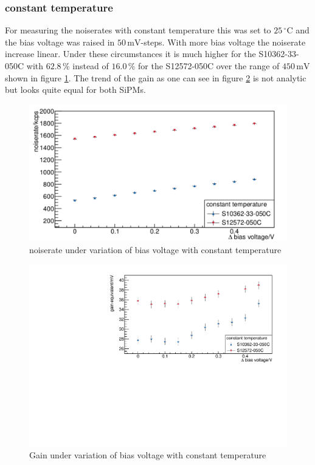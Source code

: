 \subsubsection{constant temperature}
For measuring the noiserates with constant temperature this was set to $25\,\mathrm{^{\circ}C}$ and the bias voltage was raised in $50\,\mathrm{mV}$-steps. With more bias voltage the noiserate increase linear. Under these circumstances it is much higher for the S10362-33-050C with $62.8\,\mathrm{\%}$ instead of $16.0\,\mathrm{\%}$ for the S12572-050C over the range of $450\,\mathrm{mV}$ shown in figure \ref{constTemp_rate}. The trend of the gain as one can see in figure \ref{constTemp_gain} is not analytic but looks quite equal for both SiPMs.
\begin{figure}[h]
	\centering
	\includegraphics[width = 0.75 \textwidth]{Figures/radermacher/ConstTemp_Rate_linear.pdf}
	\caption{noiserate under variation of bias voltage with constant temperature}
	\label{constTemp_rate}
\end{figure}
\begin{figure}[h]
	\centering
	\includegraphics[width = 0.75 \textwidth]{Figures/radermacher/constTemp_Gain.pdf}
	\caption{Gain under variation of bias voltage with constant temperature}
	\label{constTemp_gain}
\end{figure}
